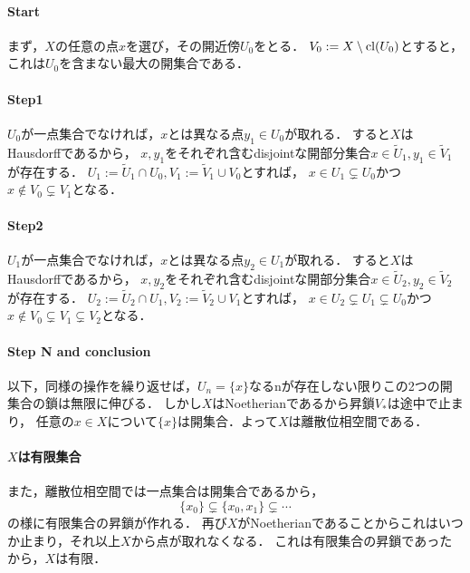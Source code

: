 \documentclass[a4paper]{jsarticle}
\begin{document}
    \paragraph{Start}
    まず，$X$の任意の点$x$を選び，その開近傍$U_0$をとる．
    $V_0:=X \setminus \operatorname{cl}(U_0)$とすると，これは$U_0$を含まない最大の開集合である．

    \paragraph{Step1}
    $U_0$が一点集合でなければ，$x$とは異なる点$y_1 \in U_0$が取れる．
    すると$X$はHausdorffであるから，
    $x, y_1$をそれぞれ含むdisjointな開部分集合$x \in \tilde{U}_1, y_1 \in \tilde{V}_1$が存在する．
    $U_1:=\tilde{U}_1 \cap U_0, V_1:=\tilde{V}_1 \cup V_0$とすれば，
    $x \in U_1 \subsetneq U_0$かつ$x \not \in V_0 \subsetneq V_1$となる．

    \paragraph{Step2}
    $U_1$が一点集合でなければ，$x$とは異なる点$y_2 \in U_1$が取れる．
    すると$X$はHausdorffであるから，
    $x, y_2$をそれぞれ含むdisjointな開部分集合$x \in \tilde{U}_2, y_2 \in \tilde{V}_2$が存在する．
    $U_2:=\tilde{U}_2 \cap U_1, V_2:=\tilde{V}_2 \cup V_1$とすれば，
    $x \in U_2 \subsetneq U_1 \subsetneq U_0$かつ$x \not \in V_0 \subsetneq V_1 \subsetneq V_2$となる．

    \paragraph{Step N and conclusion}
    以下，同様の操作を繰り返せば，$U_n=\{x\}$なるnが存在しない限りこの2つの開集合の鎖は無限に伸びる．
    しかし$X$はNoetherianであるから昇鎖$V_{\ast}$は途中で止まり，
    任意の$x \in X$について$\{x\}$は開集合．よって$X$は離散位相空間である．

    \paragraph{$X$は有限集合}
    また，離散位相空間では一点集合は開集合であるから，
    \[ \{x_0\} \subsetneq \{x_0, x_1\} \subsetneq \cdots \]
    の様に有限集合の昇鎖が作れる．
    再び$X$がNoetherianであることからこれはいつか止まり，それ以上$X$から点が取れなくなる．
    これは有限集合の昇鎖であったから，$X$は有限．
\end{document}
